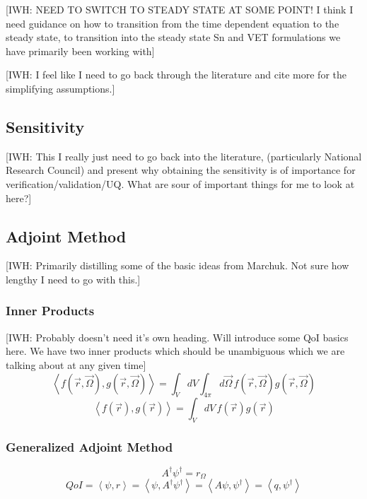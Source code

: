 \documentclass{article}
\newcommand{\vr}{\vec{r}}
\newcommand{\vO}{\vec{\Omega}}
\newcommand{\bra}{\left\langle}
\newcommand{\ket}{\right\rangle}
\newcommand{\angResp}{r_\Omega}
\begin{document}
{\color{red}[IWH: NEED TO SWITCH TO STEADY STATE AT SOME POINT! I think I need guidance on how to transition from the time dependent equation to the steady state, to transition into the steady state Sn and VET formulations we have primarily been working with]}

{\color{red}[IWH: I feel like I need to go back through the literature and cite more for the simplifying assumptions.]}


\subsection{Sensitivity}
{\color{red}[IWH: This I really just need to go back into the literature, (particularly National Research Council) and present why obtaining the sensitivity is of importance for verification/validation/UQ. What are sour of important things for me to look at here?]}

\subsection{Adjoint Method}
{\color{red}[IWH: Primarily distilling some of the basic ideas from Marchuk. Not sure how lengthy I need to go with this.]}

\subsubsection{Inner Products}
{\color{red}[IWH: Probably doesn't need it's own heading. Will introduce some QoI basics here. We have two inner products which should be unambiguous which we are talking about at any given time]}
\begin{equation}
\bra f(\vr, \vO) , g(\vr, \vO) \ket  = \int_V dV \int_{4 \pi} d \vO \,  f(\vr, \vO)g(\vr, \vO)
\end{equation}
\begin{equation}
\bra f(\vr) , g(\vr) \ket  = \int_V dV \,  f(\vr)g(\vr)
\end{equation}
\subsubsection{Generalized Adjoint Method}
\begin{equation}
\label{adjGeneral}
A^\dag \psi^\dag = \angResp
\end{equation}
\begin{equation}
\label{adjGeneral2}
QoI = \bra \psi, r \ket = \bra \psi  , A^\dag \psi^\dag \ket =  \bra A \psi  , \psi^\dag \ket =  \bra q  , \psi^\dag \ket 
\end{equation}
\end{document}
